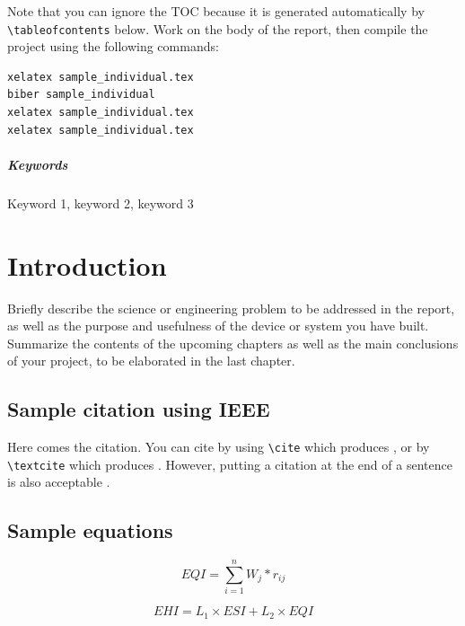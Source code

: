 \documentclass{senior-design}
\begin{document}
Note that you can ignore the TOC because it is generated automatically by \verb|\tableofcontents| below. Work on the body of the report, then compile the project using the following commands:
\begin{lstlisting}
xelatex sample_individual.tex
biber sample_individual
xelatex sample_individual.tex
xelatex sample_individual.tex
\end{lstlisting}

\paragraph{Keywords}
Keyword 1, keyword 2, keyword 3

\tableofcontents\thispagestyle{toc}

\mainmatter
\chapter{Introduction}
Briefly describe the science or engineering problem to be addressed in the report, as well as the purpose and usefulness of the device or system you have built. Summarize the contents of the upcoming chapters as well as the main conclusions of your project, to be elaborated in the last chapter.

\section{Sample citation using IEEE}
Here comes the citation. You can cite by using \verb|\cite| which produces \cite{book1,paper1}, or by \verb|\textcite| which produces \textcite{book2}. However, putting a citation at the end of a sentence is also acceptable \cite{webpage1}.

\section{Sample equations}
\begin{equation}
    EQI = \sum_{i=1}^{n}W_j * r_{ij}
\end{equation}

\begin{equation}
    EHI = L_1 \times ESI + L_2 \times EQI
\end{equation}
\end{document}

